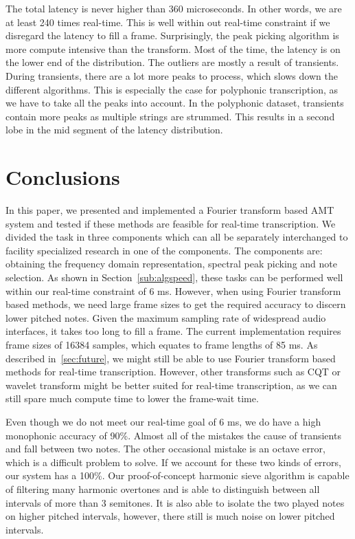 \documentclass[10pt,twocolumn]{article}
\begin{document}
The total latency is never higher than 360 microseconds. In other words, we are at least 240 times real-time. This is well within out real-time constraint if we disregard the latency to fill a frame. Surprisingly, the peak picking algorithm is more compute intensive than the transform. Most of the time, the latency is on the lower end of the distribution. The outliers are mostly a result of transients. During transients, there are a lot more peaks to process, which slows down the different algorithms. This is especially the case for polyphonic transcription, as we have to take all the peaks into account. In the polyphonic dataset, transients contain more peaks as multiple strings are strummed. This results in a second lobe in the mid segment of the latency distribution.


\section{Conclusions}
In this paper, we presented and implemented a Fourier transform based AMT system and tested if these methods are feasible for real-time transcription. We divided the task in three components which can all be separately interchanged to facility specialized research in one of the components. The components are: obtaining the frequency domain representation, spectral peak picking and note selection. As shown in Section~\ref{sub:algspeed}, these tasks can be performed well within our real-time constraint of 6 ms. However, when using Fourier transform based methods, we need large frame sizes to get the required accuracy to discern lower pitched notes. Given the maximum sampling rate of widespread audio interfaces, it takes too long to fill a frame. The current implementation requires frame sizes of 16384 samples, which equates to frame lengths of 85 ms. As described in~\ref{sec:future}, we might still be able to use Fourier transform based methods for real-time transcription. However, other transforms such as CQT or wavelet transform might be better suited for real-time transcription, as we can still spare much compute time to lower the frame-wait time.

Even though we do not meet our real-time goal of 6 ms, we do have a high monophonic accuracy of 90\%. Almost all of the mistakes the cause of transients and fall between two notes. The other occasional mistake is an octave error, which is a difficult problem to solve. If we account for these two kinds of errors, our system has a 100\%. Our proof-of-concept harmonic sieve algorithm is capable of filtering many harmonic overtones and is able to distinguish between all intervals of more than 3 semitones. It is also able to isolate the two played notes on higher pitched intervals, however, there still is much noise on lower pitched intervals.
\end{document}
